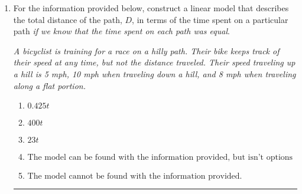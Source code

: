 \documentclass[14pt]{extbook}
\newcommand{\litem}[1]{\item#1\hspace*{-1cm}\rule{\textwidth}{0.4pt}}
\begin{document}
\begin{enumerate}
{\begin{enumerate}[label=\Alph*.]
\end{enumerate} }
\litem{
For the information provided below, construct a linear model that describes the total distance of the path, $D$, in terms of the time spent on a particular path \textit{if we know that the time spent on each path was equal}.
\begin{center}
    \textit{ A bicyclist is training for a race on a hilly path. Their bike keeps track of their speed at any time, but not the distance traveled. Their speed traveling up a hill is 5 mph, 10 mph when traveling down a hill, and 8 mph when traveling along a flat portion. }
\end{center}
\begin{enumerate}[label=\Alph*.]
\item \( 0.425 t \)
\item \( 400 t \)
\item \( 23 t \)
\item \( \text{The model can be found with the information provided, but isn't options 1-3.} \)
\item \( \text{The model cannot be found with the information provided.} \)

\end{enumerate} }
\end{enumerate}
\end{document}
